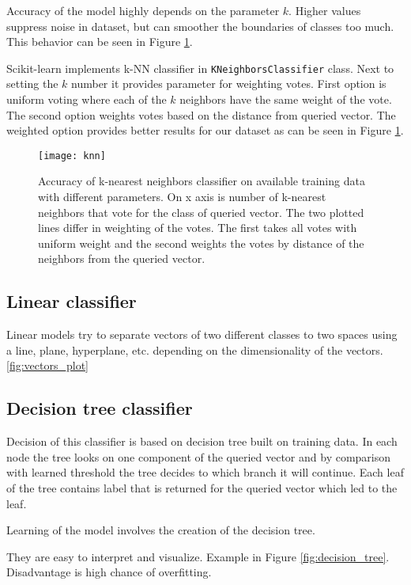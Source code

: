 Accuracy of the model highly depends on the parameter $k$. Higher values
suppress noise in dataset, but can smoother the boundaries of classes too much.
This behavior can be seen in Figure \ref{fig:knn}.

Scikit-learn implements k-NN classifier in \texttt{KNeighborsClassifier} class.
Next to setting the $k$ number it provides parameter for weighting votes. First
option is uniform voting where each of the $k$ neighbors have the same weight of
the vote. The second option weights votes based on the distance from queried
vector. The weighted option provides better results for our dataset as can be
seen in Figure \ref{fig:knn}.

\begin{figure}
  \centering
  \texttt{[image: knn]}
  \caption{Accuracy of k-nearest neighbors classifier on available training
    data with different parameters. On x axis is number of k-nearest neighbors
    that vote for the class of queried vector. The two plotted lines differ in
    weighting of the votes. The first takes all votes with uniform weight and
    the second weights the votes by distance of the neighbors from the queried
    vector.}
  \label{fig:knn}
\end{figure}

\subsection{Linear classifier}
Linear models try to separate vectors of two different classes to two spaces
using a line, plane, hyperplane, etc. depending on the dimensionality of the
vectors.
\ref{fig:vectors_plot}

\subsection{Decision tree classifier}
Decision of this classifier is based on decision tree built on training data.
In each node the tree looks on one component of the queried vector and by
comparison with learned threshold the tree decides to which branch it will
continue. Each leaf of the tree contains label that is returned for the queried
vector which led to the leaf.

Learning of the model involves the creation of the decision tree.

They are easy to interpret and visualize. Example in Figure \ref{fig:decision_tree}.
Disadvantage is high chance of overfitting.

